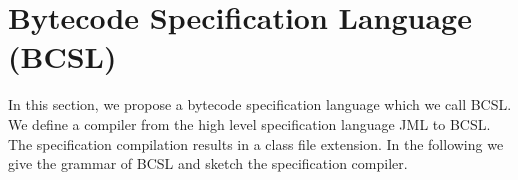 
\section{Bytecode Specification Language (BCSL)}\label{bcSpecLg}
In this section, we propose a bytecode specification language which we call BCSL. We define a compiler from the high level specification language JML to BCSL. The specification compilation results in a class file extension. In the following we give the grammar of BCSL and sketch the specification compiler.



